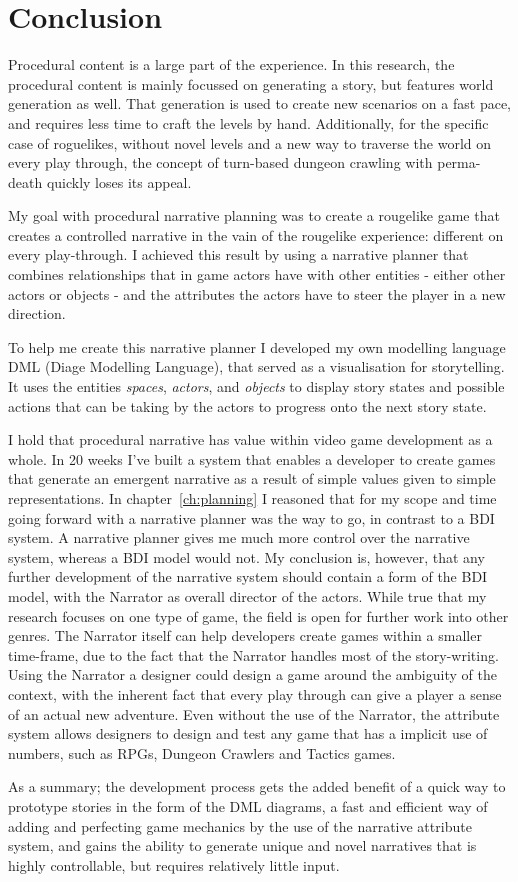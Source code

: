 \chapter{Conclusion}
Procedural content is a large part of the \rogue experience. 
In this research, the procedural content is mainly focussed on generating a story, but features world generation as well.
That generation is used to create new scenarios on a fast pace, and requires less time to craft the levels by hand.
Additionally, for the specific case of roguelikes, without novel levels and a new way to traverse the world on every play through, the concept of turn-based dungeon crawling with perma-death quickly loses its appeal.

My goal with procedural narrative planning was to create a rougelike game that creates a controlled narrative in the vain of the rougelike experience: different on every play-through.
I achieved this result by using a narrative planner that combines relationships that in game actors have with other entities - either other actors or objects - and the attributes the actors have to steer the player in a new direction.

To help me create this narrative planner I developed my own modelling language DML (Diage Modelling Language), that served as a visualisation for storytelling.
It uses the entities \textit{spaces}, \textit{actors}, and \textit{objects} to display story states and possible actions that can be taking by the actors to progress onto the next story state. 

I hold that procedural narrative has value within video game development as a whole.
In 20 weeks I've built a system that enables a developer to create games that generate an emergent narrative as a result of simple values given to simple representations.
In chapter~\ref{ch:planning} I reasoned that for my scope and time going forward with a narrative planner was the way to go, in contrast to a BDI system.
A narrative planner gives me much more control over the narrative system, whereas a BDI model would not. 
My conclusion is, however, that any further development of the narrative system should contain a form of the BDI model, with the Narrator as overall director of the actors. 
While true that my research focuses on one type of game, the field is open for further work into other genres.
The Narrator itself can help developers create \rogue games within a smaller time-frame, due to the fact that the Narrator handles most of the story-writing.
Using the Narrator a designer could design a game around the ambiguity of the context, with the inherent fact that every play through can give a player a sense of an actual new adventure.
Even without the use of the Narrator, the attribute system allows designers to design and test any game that has a implicit use of numbers, such as RPGs, Dungeon Crawlers and Tactics games.

As a summary; the development process gets the added benefit of a quick way to prototype stories in the form of the DML diagrams, a fast and efficient way of adding and perfecting game mechanics by the use of the narrative attribute system, and gains the ability to generate unique and novel narratives that is highly controllable, but requires relatively little input.